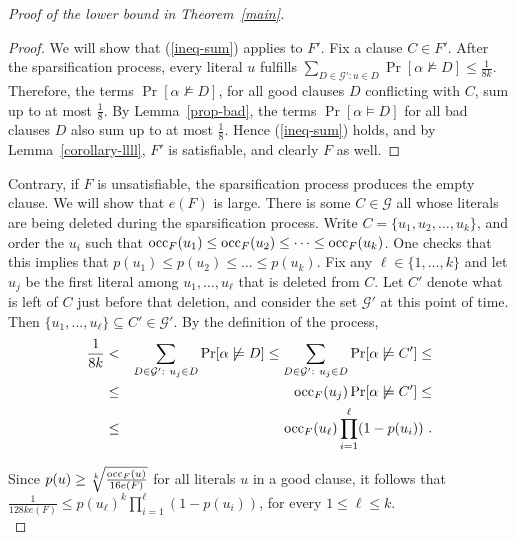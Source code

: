 \documentclass[a4paper, 11pt]{article}
\newcommand{\occ}{\ensuremath{{\rm{occ}}}}
\begin{document}
\begin{proof}[Proof of the lower bound in Theorem~\ref{main}]
\begin{proof}
  We will show that (\ref{ineq-sum}) applies to $F'$. Fix a clause $C
  \in F'$. After the sparsification process, every literal $u$
  fulfills $\sum_{D\in \mathcal{G'} : u \in D }\Pr[\alpha \not \models
  D] \leq \frac{1}{8k}$.  Therefore, the terms $\Pr[\alpha \not
  \models D]$, for all good clauses $D$ conflicting with $C$, sum up to at
  most $\frac{1}{8}$. By Lemma~\ref{prop-bad}, the terms $\Pr[\alpha
  \models D]$ for all bad clauses $D$ also sum up to at most
  $\frac{1}{8}$.  Hence (\ref{ineq-sum}) holds, and by
  Lemma~\ref{corollary-llll}, $F'$ is satisfiable, and clearly
  $F$ as well.  
\end{proof}

Contrary, if $F$ is unsatisfiable, the sparsification process produces
the empty clause.  We will show that $e(F)$ is large. There is some $C
\in \mathcal{G}$ all whose literals are being deleted during the
sparsification process. Write $C = \{u_1, u_2, \dots, u_k\}$, and
order the $u_i$ such that $\occ_F(u_1) \leq \occ_F(u_2)\leq \dots \leq
\occ_F(u_k)$. One checks that this implies that $p(u_1) \leq p(u_2)
\leq \dots \leq p(u_k)$.  Fix any $\ell \in \{1,\dots,k\}$ and let
$u_j$ be the first literal among $u_1,\dots,u_\ell$ that is deleted
from $C$. Let $C'$ denote what is left of $C$ just before that
deletion, and consider the set $\mathcal{G}'$ at this point of time.
Then $\{u_1,\dots,u_\ell\} \subseteq C' \in \mathcal{G}'$. By the
definition of the process,
  \begin{eqnarray*}
    \frac{1}{8k} & < & \sum_{D \in \mathcal{G}' :\ u_j \in D} \Pr[\alpha 
    \not \models D] \leq
    \sum_{D\in \mathcal{G}' :\ u_j \in D } \Pr[\alpha 
    \not \models C'] \leq \\
    & \leq & \occ_F(u_j) \Pr[\alpha \not \models C'] \leq \\
    & \leq & \occ_F(u_\ell) \prod_{i=1}^{\ell} (1-p(u_i)) \ .
  \end{eqnarray*}
  
  Since $p(u) \geq \sqrt[k]{\frac{\occ_F(u)}{16e(F)}}$ for all
  literals $u$ in a good clause, it follows that $\frac{1}{128ke(F)}
  \leq p(u_\ell)^k\prod_{i=1}^{\ell} (1-p(u_i))$,
  for every $1\leq \ell \leq k$.\\
  

\end{proof}
\end{document}
